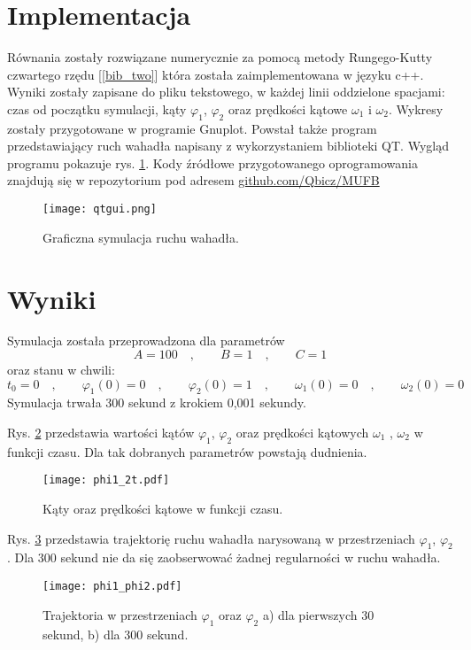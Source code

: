 \documentclass[11pt]{aghdpl}
\begin{document}
\clearpage
\section{Implementacja}
Równania zostały rozwiązane numerycznie za pomocą metody Rungego-Kutty czwartego rzędu [\ref{bib_two}] która została zaimplementowana w języku c++. Wyniki zostały zapisane do pliku tekstowego, w każdej linii oddzielone spacjami: czas od początku symulacji, kąty $\varphi_1$, $\varphi_2$ oraz prędkości kątowe $\omega_1$ i $\omega_2$. Wykresy zostały przygotowane w programie Gnuplot. Powstał także program przedstawiający ruch wahadła napisany z wykorzystaniem biblioteki QT. Wygląd programu pokazuje rys. \ref{QTgui}. Kody źródłowe przygotowanego oprogramowania znajdują się w repozytorium pod adresem \href{http://www.github.com/Qbicz/MUFB}{github.com/Qbicz/MUFB} 
\begin{figure}[h!]
	\centering
	\texttt{[image: qtgui.png]}
	\caption{Graficzna symulacja ruchu wahadła.}
	\label{QTgui}
\end{figure}

\section{Wyniki}
Symulacja została przeprowadzona dla parametrów 
\begin{equation}
	A = 100\quad , \qquad B = 1 \quad , \qquad C = 1
\end{equation} 
oraz stanu w chwili:
\begin{equation} \nonumber
	t_0=0 \quad , \qquad \varphi_1(0) = 0 \quad , \qquad 			\varphi_2(0) = 1 \quad , \qquad \omega_1(0) = 0 \quad , 		\qquad \omega_2(0) = 0
\end{equation}
Symulacja trwała 300 sekund z krokiem 0,001 sekundy.

Rys. \ref{phi1_2odt.} przedstawia wartości kątów $\varphi_1$, $\varphi_2$ oraz prędkości kątowych $\omega_1$ , $\omega_2$ w funkcji czasu. Dla tak dobranych parametrów powstają dudnienia.
\begin{figure}[h!]
	\centering
	\texttt{[image: phi1\_2t.pdf]}
	\caption{Kąty oraz prędkości kątowe w funkcji czasu.}	
	\label{phi1_2odt.}
\end{figure}

Rys. \ref{phi1_phi2} przedstawia trajektorię ruchu wahadła narysowaną w przestrzeniach $\varphi_1$, $\varphi_2$. Dla 300 sekund nie da się zaobserwować żadnej regularności w ruchu wahadła.
\begin{figure}[h!]
	\centering
	\texttt{[image: phi1\_phi2.pdf]}
	\caption{Trajektoria w przestrzeniach $\varphi_1$ oraz $\varphi_2$ \quad a) dla pierwszych 30 sekund, \quad b) dla 300 sekund.}
	\label{phi1_phi2}
\end{figure}
\end{document}
